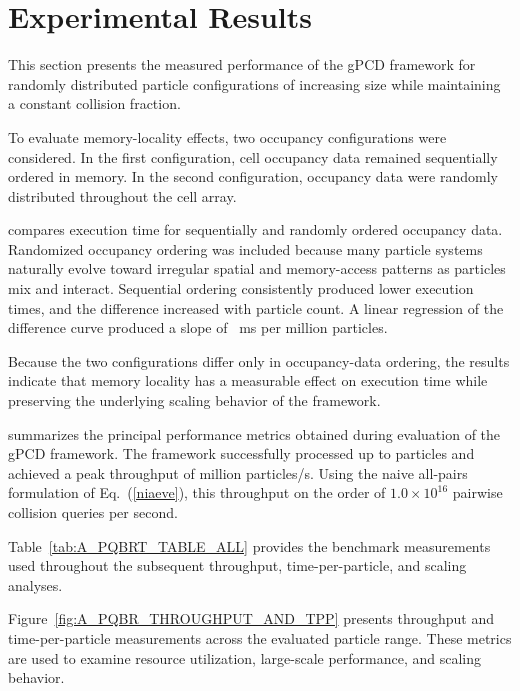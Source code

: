\section{Experimental Results}

This section presents the measured performance of the gPCD framework
for randomly distributed particle configurations of increasing size
while maintaining a constant collision fraction.

To evaluate memory-locality effects, two occupancy configurations were
considered. In the first configuration, cell occupancy data remained
sequentially ordered in memory. In the second configuration, occupancy
data were randomly distributed throughout the cell array.

 compares execution time for sequentially and
randomly ordered occupancy data. Randomized occupancy ordering was
included because many particle systems naturally evolve toward
irregular spatial and memory-access patterns as particles mix and
interact. Sequential ordering consistently produced lower execution
times, and the difference increased with particle count. A linear
regression of the difference curve produced a slope of
\PPBQDiffSlope\ ms per million particles.



Because the two configurations differ only in occupancy-data ordering,
the results indicate that memory locality has a measurable effect on
execution time while preserving the underlying scaling behavior of the
framework.



 summarizes the principal performance metrics
obtained during evaluation of the gPCD framework. The framework
successfully processed up to \SUMMARYPARTICLECOUNT{} particles and
achieved a peak throughput of \SUMMARYTHROUGHPUT{} million
particles/s. Using the naive all-pairs formulation of
Eq.~(\ref{niaeve}), this throughput on the order of
$1.0\times10^{16}$ pairwise collision queries per second.


Table~\ref{tab:A_PQBRT_TABLE_ALL} provides the benchmark measurements
used throughout the subsequent throughput, time-per-particle, and
scaling analyses.

Figure~\ref{fig:A_PQBR_THROUGHPUT_AND_TPP} presents throughput and
time-per-particle measurements across the evaluated particle range.
These metrics are used to examine resource utilization, large-scale
performance, and scaling behavior.


